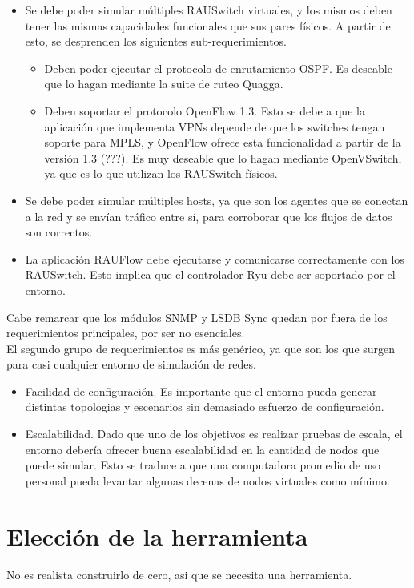 \begin{itemize}
	\item Se debe poder simular múltiples RAUSwitch virtuales, y los mismos deben tener las mismas capacidades funcionales que sus pares físicos. A partir de esto, se desprenden los siguientes sub-requerimientos.
	\begin{itemize}
		\item Deben poder ejecutar el protocolo de enrutamiento OSPF. Es deseable que lo hagan mediante la suite de ruteo Quagga.
		\item Deben soportar el protocolo OpenFlow 1.3. Esto se debe a que la aplicación que implementa VPNs depende de que los switches tengan soporte para MPLS, y OpenFlow ofrece esta funcionalidad a partir de la versión 1.3 (???). Es muy deseable que lo hagan mediante OpenVSwitch, ya que es lo que utilizan los RAUSwitch físicos.
	\end{itemize}
	\item Se debe poder simular múltiples hosts, ya que son los agentes que se conectan a la red y se envían tráfico entre sí, para corroborar que los flujos de datos son correctos.
	\item La aplicación RAUFlow debe ejecutarse y comunicarse correctamente con los RAUSwitch. Esto implica que el controlador Ryu debe ser soportado por el entorno.
\end{itemize}

Cabe remarcar que los módulos SNMP y LSDB Sync quedan por fuera de los requerimientos principales, por ser no esenciales. \\

El segundo grupo de requerimientos es más genérico, ya que son los que surgen para casi cualquier entorno de simulación de redes.

\begin{itemize} 
	\item Facilidad de configuración. Es importante que el entorno pueda generar distintas topologias y escenarios sin demasiado esfuerzo de configuración.
	\item Escalabilidad. Dado que uno de los objetivos es realizar pruebas de escala, el entorno debería ofrecer buena escalabilidad en la cantidad de nodos que puede simular. Esto se traduce a que una computadora promedio de uso personal pueda levantar algunas decenas de nodos virtuales como mínimo.
\end{itemize}

\section{Elección de la herramienta}
No es realista construirlo de cero, asi que se necesita una herramienta.


